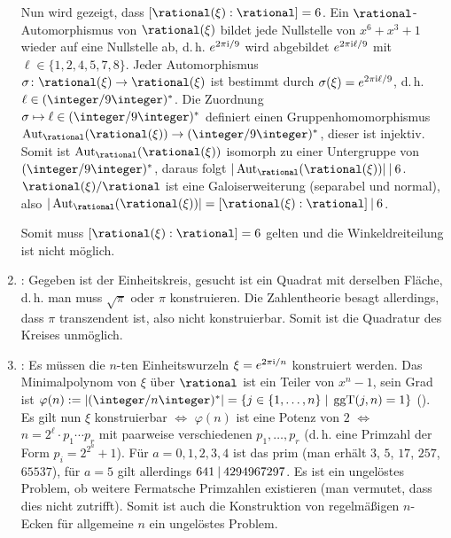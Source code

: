 \begin{Bem}
\begin{enumerate}
        Nun wird gezeigt, dass $[\rational(\xi):\rational] = 6$.
        Ein $\rational$-Automorphismus von $\rational(\xi)$ bildet
        jede Nullstelle von $x^6 + x^3 + 1$ wieder auf eine Nullstelle
        ab, d.\,h. $e^{2\pi\text{i}/9}$ wird abgebildet
        $e^{2\pi\text{i}\ell/9}$ mit $\ell \in \{1, 2, 4, 5, 7, 8\}$.
        Jeder Automorphismus
        $\sigma\colon \rational(\xi) \rightarrow \rational(\xi)$ ist bestimmt
        durch $\sigma(\xi) = e^{2\pi\text{i}\ell/9}$, d.\,h.
        $\ell \in (\integer/9\integer)^\ast$.
        Die Zuordnung $\sigma \mapsto \ell \in (\integer/9\integer)^\ast$
        definiert einen Gruppenhomomorphismus
        $\Aut_\rational(\rational(\xi)) \rightarrow (\integer/9\integer)^\ast$,
        dieser ist injektiv.
        Somit ist $\Aut_\rational(\rational(\xi))$ isomorph zu einer
        Untergruppe von $(\integer/9\integer)^\ast$,
        daraus folgt $|\Aut_\rational(\rational(\xi))| \teilt 6$.
        $\rational(\xi)/\rational$ ist eine Galoiserweiterung
        (separabel und normal), also
        $|\Aut_\rational(\rational(\xi))| =
        [\rational(\xi):\rational] \teilt 6$.

        Somit muss $[\rational(\xi):\rational] = 6$ gelten und
        die Winkeldreiteilung ist nicht möglich.

        \item
        :
        Gegeben ist der Einheitskreis,
        gesucht ist ein Quadrat mit derselben Fläche, d.\,h.
        man muss $\sqrt{\pi}$ oder $\pi$ konstruieren.
        Die Zahlentheorie besagt allerdings, dass $\pi$ transzendent ist,
        also nicht konstruierbar.
        Somit ist die Quadratur des Kreises unmöglich.

        \item
        :
        Es müssen die $n$-ten Einheitswurzeln $\xi = e^{2\pi\text{i}/n}$
        konstruiert werden.
        Das Minimalpolynom von $\xi$ über $\rational$ ist ein Teiler von
        $x^n - 1$, sein Grad ist $\varphi(n) := |(\integer/n\integer)^\ast| =
        \{j \in \{1, \dotsc, n\} \;|\; \ggT(j, n) = 1\}$
        ().
        Es gilt nun $\xi$ konstruierbar $\iff$
        $\varphi(n)$ ist eine Potenz von $2$ $\iff$
        $n = 2^\ell \cdot p_1 \dotsm p_r$ mit
        paarweise verschiedenen 
        $p_1, \dotsc, p_r$
        (d.\,h. eine Primzahl der Form $p_i = 2^{2^a} + 1$).
        Für $a = 0, 1, 2, 3, 4$ ist das prim
        (man erhält $3$, $5$, $17$, $257$, $65537$),
        für $a = 5$ gilt allerdings $641 \mathbin{|} 4294967297$.
        Es ist ein ungelöstes Problem, ob weitere Fermatsche Primzahlen
        existieren
        (man vermutet, dass dies nicht zutrifft).
        Somit ist auch die Konstruktion von regelmäßigen $n$-Ecken
        für allgemeine $n$ ein ungelöstes Problem.
    \end{enumerate}
\end{Bem}

